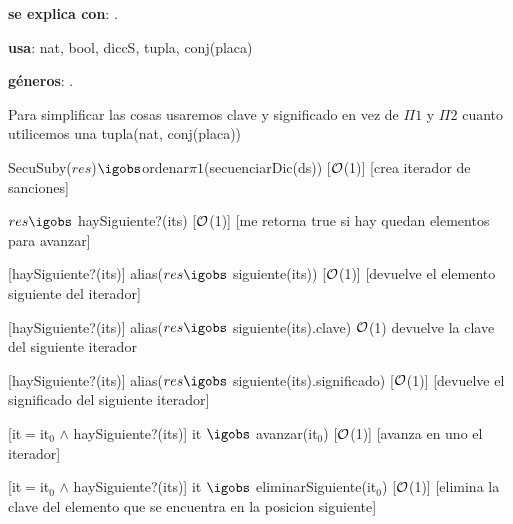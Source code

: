 \begin{Interfaz}

	\textbf{se explica con}: .

	\textbf{usa}: nat, bool, diccS, tupla, conj(placa)

	\textbf{géneros}: .

	
	Para simplificar las cosas usaremos clave y significado en vez de $\Pi1$ y $\Pi2$ cuanto utilicemos una tupla(nat, conj(placa))
	
	{SecuSuby($res$)$\igobs$ordenar$\pi1$(secuenciarDic(ds))}
	[$\mathcal{O}$(1)]
	[crea iterador de sanciones]
	
	{$res \igobs$ haySiguiente?(its)}
	[$\mathcal{O}$(1)]
	[me retorna true si hay quedan elementos para avanzar]
	
	[haySiguiente?(its)]
	{alias($res \igobs$ siguiente(its))}
	[$\mathcal{O}$(1)]
	[devuelve el elemento siguiente del iterador]
	
	[haySiguiente?(its)]
	{alias($res \igobs$ siguiente(its).clave)}
	{$\mathcal{O}$(1)}
	{devuelve la clave del siguiente iterador}
	
	[haySiguiente?(its)]
	{alias($res \igobs$ siguiente(its).significado)}
	[$\mathcal{O}$(1)]
	[devuelve el significado del siguiente iterador]
	
	[it$=$it$_0$ $\land$ haySiguiente?(its)]
	{it $\igobs$ avanzar(it$_0$)}
	[$\mathcal{O}$(1)]
	[avanza en uno el iterador]

	[it$=$it$_0$ $\land$ haySiguiente?(its)]
	{it $\igobs$ eliminarSiguiente(it$_0$)}
	[$\mathcal{O}$(1)]
	[elimina la clave del elemento que se encuentra en la posicion siguiente]


\end{Interfaz}

